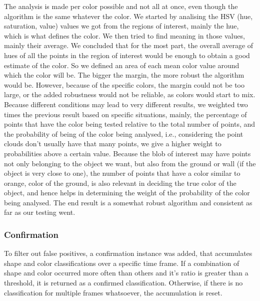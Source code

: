 The analysis is made per color possible and not all at once, even though the algorithm is the same whatever the color.
We started by analising the HSV (hue, saturation, value) values we got from the regions of interest, mainly the hue, which is what defines the color. 
We then tried to find meaning in those values, mainly their average.
We concluded that for the most part, the overall average of hues of all the points in the region of interest would be enough to obtain a good estimate of the color. 
So we defined an area of each mean color value around which the color will be.
The bigger the margin, the more robust the algorithm would be.
However, because of the specific colors, the margin could not be too large, or the added robustness would not be reliable, as colors would start to mix.
Because different conditions may lead to very different results, we weighted two times the previous result based on specific situations, mainly, the percentage of points that have the color being tested relative to the total number of points, and the probability of being of the color being analysed, i.e., considering the point clouds don't usually have that many points, we give a higher weight to probabilities above a certain value.
Because the blob of interest may have points not only belonging to the object we want, but also from the ground or wall (if the object is very close to one), the number of points that have a color similar to orange, color of the ground, is also relevant in deciding the true color of the object, and hence helps in determining the weight of the probability of the color being analysed.
The end result is a somewhat robust algorithm and consistent as far as our testing went. 

\subsubsection{Confirmation}

To filter out false positives, a confirmation instance was added, that accumulates shape and color classifications over a specific time frame.
If a combination of shape and color occurred more often than others and it's ratio is greater than a threshold, it is returned as a confirmed classification.
Otherwise, if there is no classification for multiple frames whatsoever, the accumulation is reset.
